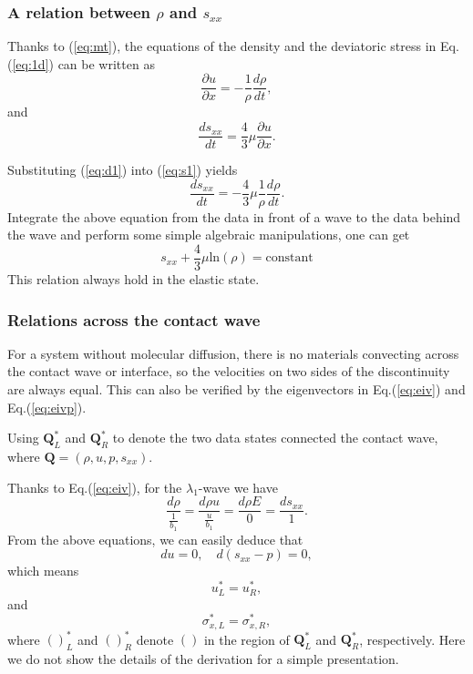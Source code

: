 \documentclass{article}
\numberwithin{equation}{section}
\numberwithin{table}{section}
\begin{document}
\subsubsection{A relation between $\rho$ and $s_{xx}$ }

Thanks to (\ref{eq:mt}), the equations of the density and the deviatoric stress in Eq.(\ref{eq:1d}) can be written as
  \begin{equation}\label{eq:d1}
    \frac{\partial u}{\partial x} = -\frac{1}{\rho}\frac{d\rho}{dt},
  \end{equation}
  and
  \begin{equation}\label{eq:s1}
    \frac{ds_{xx}}{dt}=\frac{4}{3}\mu\frac{\partial u}{\partial x}.
  \end{equation}

  Substituting (\ref{eq:d1}) into (\ref{eq:s1}) yields
  \begin{equation}
    \frac{ds_{xx}}{dt}=-\frac{4}{3}\mu \frac{1}{\rho}\frac{d\rho}{dt}.
\end{equation}
Integrate the above equation from the data in front of a wave to the data behind the wave and perform some simple algebraic manipulations, one can get
\begin{equation}\label{eq:rhosxx}
  s_{xx}+\frac{4}{3}\mu\text{ln}(\rho) = \text{constant}
\end{equation}
This relation always hold in the elastic state.

\subsubsection{Relations across the contact wave}\label{sec:contacte}
  For  a  system without molecular diffusion, there is no materials convecting  across the contact wave or interface, so the velocities on two sides of  the discontinuity are always equal. %
  This can also be verified by the eigenvectors  in Eq.(\ref{eq:eiv}) and  Eq.(\ref{eq:eivp}).

Using $\mathbf{Q}_L^*$ and $\mathbf{Q}_R^*$ to denote the two data states connected the contact wave, where $\mathbf{Q}=\left(\rho,u,p,s_{xx}\right)$.


Thanks to Eq.(\ref{eq:eiv}), for the $\lambda_{1}$-wave we
have
\begin{equation}   \label{e23a}
\frac{d \rho}{\frac{1}{b_{1}}} = \frac{d \rho u}{\frac{u
}{b_{1}}}=\frac{d \rho E}{0} = \frac{d s_{xx}}{1}.
\end{equation}
From the above equations, we can easily deduce that
\begin{equation}   \label{e23b}
du = 0, \quad d(s_{xx}-p)=0,
\end{equation}
 which means
\begin{equation}   \label{e23c}
  u_{L}^{\ast}=u_{R}^{\ast},
\end{equation}
and
\begin{equation}   \label{e23d}
\sigma_{x,L}^{\ast}=\sigma_{x,R}^{\ast},
\end{equation}
where $()_{L}^{\ast}$ and $()_{R}^{\ast}$ denote $()$ in the region
of $\mathbf{Q}_{L}^{\ast}$ and $\mathbf{Q}_{R}^{\ast}$,
respectively. Here we do not show the details of the derivation for a simple
 presentation.
\end{document}
